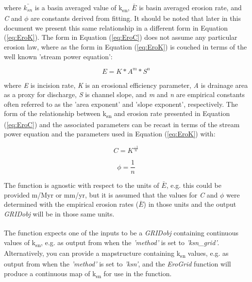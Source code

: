 \noindent where $\bar{k_{sn}}$ is a basin averaged value of k\textsubscript{sn}, $\bar{E}$ is basin averaged erosion rate, and \textit{C} and $\phi$ are constants derived from fitting. It should be noted that later in this document we present this same relationship in a different form in Equation (\ref{eq:EroK}). The form in Equation (\ref{eq:EroC}) does not assume any particular erosion law, where as the form in Equation (\ref{eq:EroK}) is couched in terms of the well known 'stream power equation':
	
\begin{equation} \label{eq:StrmPow}
E=K*A^{m}*S^{n}
\end{equation}

\noindent where \textit{E} is incision rate, \textit{K} is an erosional efficiency parameter, \textit{A} is drainage area as a proxy for discharge, \textit{S} is channel slope, and \textit{m} and \textit{n} are empirical constants often referred to as the 'area exponent' and 'slope exponent', respectively. The form of the relationship between k\textsubscript{sn} and erosion rate presented in Equation (\ref{eq:EroC}) and the associated parameters can be recast in terms of the stream power equation and the parameters used in Equation (\ref{eq:EroK}) with:

\begin{equation}
C=K^{\frac{-1}{n}}
\end{equation}

\begin{equation}
\phi=\frac{1}{n}
\end{equation}

\noindent The function is agnostic with respect to the units of $\bar{E}$, e.g. this could be provided m/Myr or mm/yr, but it is assumed that the values for \textit{C} and $\phi$ were determined with the empirical erosion rates ($\bar{E}$) in those units and the output \textit{GRIDobj} will be in those same units. 

\paragraph{}The function expects one of the inputs to be a \textit{GRIDobj} containing continuous values of k\textsubscript{sn}, e.g. as output from  when the \textit{'method'} is set to \textit{'ksn\_grid'}. Alternatively, you can provide a mapstructure containing k\textsubscript{sn} values, e.g. as output from  when the \textit{'method'} is set to \textit{'ksn'}, and the \textit{EroGrid} function will produce a continuous map of k\textsubscript{sn} for use in the function. 

